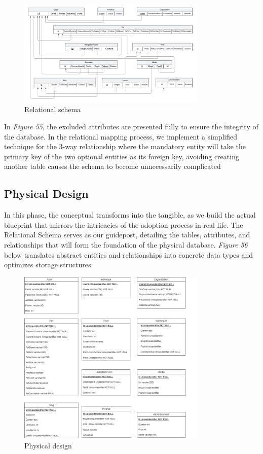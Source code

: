 \begin {figure}[H]
\centering
\includegraphics[width=0.8\textwidth]{Figures/relational_schema.png}
\caption{Relational schema}
\end{figure}

In \emph{Figure 55}, the excluded attributes are presented fully to
ensure the integrity of the database. In the relational mapping process,
we implement a simplified technique for the 3-way relationship where the
mandatory entity will take the primary key of the two optional entities
as its foreign key, avoiding creating another table causes the schema to
become unnecessarily complicated

\subsection{Physical Design}

In this phase, the conceptual transforms into the tangible, as we build the actual blueprint that mirrors the intricacies of the adoption process in real life. The Relational Schema serves as our guidepost, detailing the tables, attributes, and relationships that will form the foundation of the physical database. \textit{Figure 56} below translates abstract entities and relationships into concrete data types and optimizes storage structures.

\begin {figure}[H]
\centering
\includegraphics[width=0.8\textwidth]{Figures/physical_db.png}
\caption{Physical design}
\end{figure}





